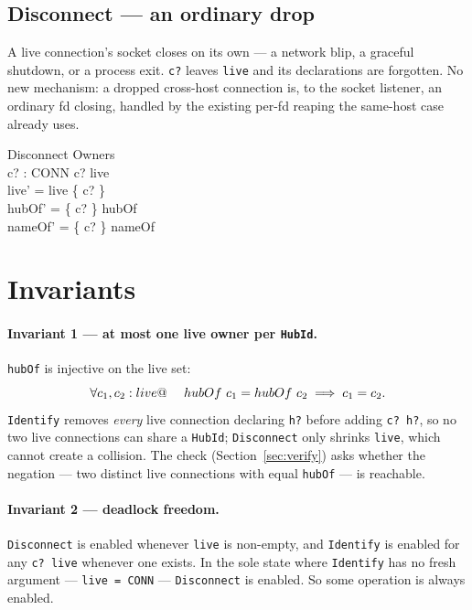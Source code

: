 \documentclass[a4paper,10pt,fleqn]{article}
\begin{document}
\subsection{Disconnect --- an ordinary drop}

A live connection's socket closes on its own --- a network blip, a
graceful shutdown, or a process exit.  \texttt{c?} leaves \texttt{live}
and its declarations are forgotten.  No new mechanism: a dropped
cross-host connection is, to the socket listener, an ordinary fd closing,
handled by the existing per-fd reaping the same-host case already uses.

\begin{schema}{Disconnect}
  \Delta Owners \\
  c? : CONN
\where
  c? \in live \\
  live' = live \setminus \{ c? \} \\
  hubOf' = \{ c? \} \ndres hubOf \\
  nameOf' = \{ c? \} \ndres nameOf
\end{schema}

\section{Invariants}
\label{sec:inv}

\paragraph{Invariant 1 --- at most one live owner per \texttt{HubId}.}
\texttt{hubOf} is injective on the live set:
\[
  \forall c_1, c_2 : live @ \\
  \quad~ hubOf~c_1 = hubOf~c_2 \implies c_1 = c_2.
\]
\texttt{Identify} removes \emph{every} live connection declaring
\texttt{h?} before adding \texttt{c? \mapsto h?}, so no two live
connections can share a \texttt{HubId}; \texttt{Disconnect} only shrinks
\texttt{live}, which cannot create a collision.  The check
(Section~\ref{sec:verify}) asks whether the negation --- two distinct live
connections with equal \texttt{hubOf} --- is reachable.

\paragraph{Invariant 2 --- deadlock freedom.}
\texttt{Disconnect} is enabled whenever \texttt{live} is non-empty, and
\texttt{Identify} is enabled for any \texttt{c? \notin live} whenever one
exists.  In the sole state where \texttt{Identify} has no fresh argument
--- \texttt{live = CONN} --- \texttt{Disconnect} is enabled.  So some
operation is always enabled.
\end{document}
